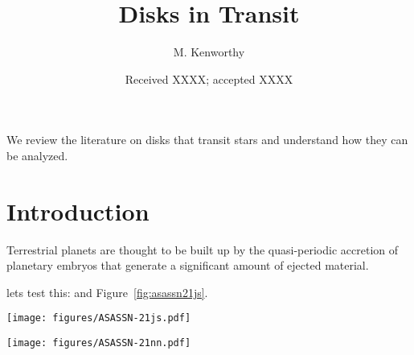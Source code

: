 \documentclass{aa}
\begin{document}
 

   \title{Disks in Transit}

   \author{M. Kenworthy
          }

   \date{Received XXXX; accepted XXXX}

 
  \abstract
   {We review the literature on disks that transit stars and understand how they can be analyzed.}
   {}
   {}
   {}
   {}


   \maketitle
%

   \section{Introduction}

Terrestrial planets are thought to be built up by the quasi-periodic accretion of planetary embryos that generate a significant amount of ejected material.

lets test this: \citep{Luger2021} and Figure~\ref{fig:asassn21js}.


\begin{figure*}
   \begin{centering}
   \texttt{[image: figures/ASASSN-21js.pdf]}
      \caption{ASASSN-21js light curve. Normalised in both bands $g$ and $V$.
              }
              \label{fig:asassn21js}
              \end{centering}
       \end{figure*}

\begin{figure*}
   \begin{centering}
   \texttt{[image: figures/ASASSN-21nn.pdf]}
      \caption{ASASSN-21nn light curve. Normalised in both bands $g$ and $V$.
              }
              \label{fig:asassn21nn}
              \end{centering}
       \end{figure*}
\end{document}
